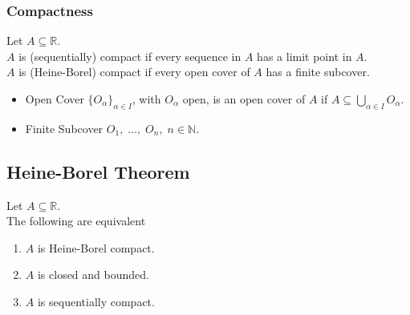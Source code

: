 \documentclass[11pt]{article}
\newcommand{\0}{\emptyset}
\newcommand{\N}{\mathbb{N}}
\newcommand{\R}{\mathbb{R}}
\begin{document}
\subsubsection*{Compactness}
\label{sec:orga35f6b7}
Let \(A\subseteq\R\).\\[0pt]
\(A\) is (sequentially) compact if every sequence in \(A\) has a limit point in \(A\).\\[0pt]
\(A\) is (Heine-Borel) compact if every open cover of \(A\) has a finite subcover.\\[0pt]
\begin{itemize}
\item Open Cover
\label{sec:org27bfd9b}
\(\{O_{\alpha}\}_{\alpha\in I}\), with \(O_{\alpha}\) open, is an open cover of \(A\) if \(A\subseteq\bigcup_{\alpha\in I}O_{\alpha}\).\\[0pt]
\item Finite Subcover
\label{sec:org360ea1b}
\(O_{1},\;\ldots,\;O_{n},\;n\in\N\).\\[0pt]
\end{itemize}
\subsection*{Heine-Borel Theorem}
\label{sec:org8fbd8f9}
Let \(A\subseteq\R\).\\[0pt]
The following are equivalent\\[0pt]
\begin{enumerate}
\item \(A\) is Heine-Borel compact.\\[0pt]
\item \(A\) is closed and bounded.\\[0pt]
\item \(A\) is sequentially compact.\\[0pt]
\end{enumerate}
\end{document}
